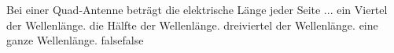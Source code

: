     {Bei einer Quad-Antenne beträgt die elektrische Länge jeder Seite ...}
    {ein Viertel der Wellenlänge.}
    {die Hälfte der Wellenlänge.}
    {dreiviertel der Wellenlänge.}
    {eine ganze Wellenlänge.}
    {false}{false}